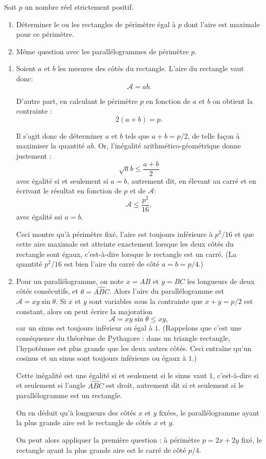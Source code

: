 \begin{exo}
\label{parallelogramme}
Soit $p$ un nombre réel strictement positif. 
\begin{enumerate}
\item Déterminer le ou les rectangles de périmètre égal à $p$ dont l'aire est maximale pour ce périmètre.
\item Même question avec les parallélogrammes de périmètre $p$.
\end{enumerate}
\begin{sol}
\begin{enumerate}
\item 
Soient $a$ et $b$ les mesures des côtés du rectangle. L'aire du rectangle vaut donc: 
\[ \mathcal A=ab.\]
 
D'autre part, en  calculant le périmètre $p$  en fonction de $a$ et $b$ on obtient la contrainte :
\[ 2(a+b)=p.\]

Il s'agit donc de déterminer $a$ et $b$ tels que $a+b=p/2$, de telle façon à maximiser la quantité $ab$. Or, l'inégalité arithmético-géométrique donne justement :
\[ \sqrt ab \leq \frac{a+b}{2} \]
avec égalité si et seulement si $a=b$, autrement dit, en élevant au carré et en écrivant le résultat en fonction de $p$ et de $\mathcal A$:
\[ \mathcal A \leq \frac{p^2}{16},\]
avec égalité ssi $a=b$.

Ceci montre qu'à périmètre fixé, l'aire est toujours inférieure à $p^2/16$ et que cette aire maximale est atteinte exactement lorsque les deux côtés du rectangle sont égaux, c'est-à-dire lorsque le rectangle est un carré. (La quantité $p^2/16$ est bien l'aire du carré de côté $a=b=p/4$.)



\item Pour un parallélogramme, on note $x=AB$ et $y=BC$ les longueurs de deux côtés consécutifs, et $\theta = \widehat{ABC}$. Alors l'aire du parallélogramme est $\mathcal A = xy\sin\theta$.  Si $x$ et $y$ sont variables sous la contrainte que $x+y = p/2$ est constant, alors on peut écrire la majoration
\[\mathcal A = xy\sin\theta \leq xy,\]
car un sinus est toujours inférieur ou égal à $1$. (Rappelons que c'est une conséquence du théorème de Pythagore : dans un triangle rectangle, l'hypoténuse est plus grande que les deux autres côtés. Ceci entraîne qu'un cosinus et un sinus sont toujours inférieurs ou égaux à $1$.)

Cette inégalité est une égalité si et seulement si le sinus vaut $1$, c'est-à-dire si et seulement si l'angle $\widehat{ABC}$ est droit, autrement dit si et seulement si le parallélogramme est un rectangle.

On en déduit qu'à longueurs des côtés $x$ et $y$ fixées, le parallélogramme ayant la plus grande aire est le rectangle de côtés $x$ et $y$.

On peut alors appliquer la première question : à périmètre $p = 2x+2y$ fixé, le rectangle ayant la plus grande aire est le carré de côté $p/4$.
\end{enumerate}
\end{sol}
\end{exo}



